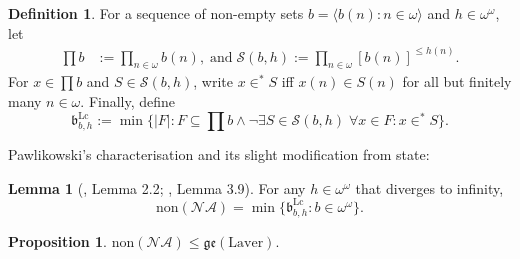 \documentclass[12pt]{article}
\theoremstyle{definition}
\newtheorem{prp}[nummer]{\sc Proposition}
\newtheorem{lem}[nummer]{\sc Lemma}
\newtheorem{defi}[nummer]{\sc Definition}
\begin{document}
\begin{defi}
For a sequence of non-empty sets $b=\langle b(n): n \in \omega\rangle$ and $h \in \omega^\omega$, let
\[\begin{aligned}\prod b&:=\prod_{n \in \omega}b(n),\; \text{and}\;
\mathcal{S}(b,h):=\prod_{n \in \omega}[b(n)]^{\leq h(n)}. \end{aligned}\]	For $x\in \prod b$ and $S \in \mathcal{S}(b,h)$, write $x \in^{*}S$ iff $x(n)\in S(n)$ for all but finitely many $n\in \omega$. Finally, define
\[\mathfrak{b}^{\text{Lc}}_{b,h}:=\min\{|F|: F \subseteq \prod b \land \neg \exists S \in \mathcal{S}(b,h)\; \forall x \in F: x \in^{*}S \}.\]
\end{defi}

Pawlikowski's characterisation and its slight modification from \cite{carmej} state: 

\begin{lem}[\cite{paw}, Lemma 2.2; \cite{carmej}, Lemma 3.9]\label{lem-non(na)char}
For any $h \in \omega^\omega$ that diverges to infinity,
\[\text{non}(\mathcal{NA})=\min\{\mathfrak{b}^{\text{Lc}}_{b,h}: b \in \omega^\omega\}.\]	
\end{lem}

\begin{prp}\label{prp:lowerboundnon}
    $\text{non}(\mathcal{NA})\leq\mathfrak{ge}(\text{Laver})$.
\end{prp}
\end{document}
